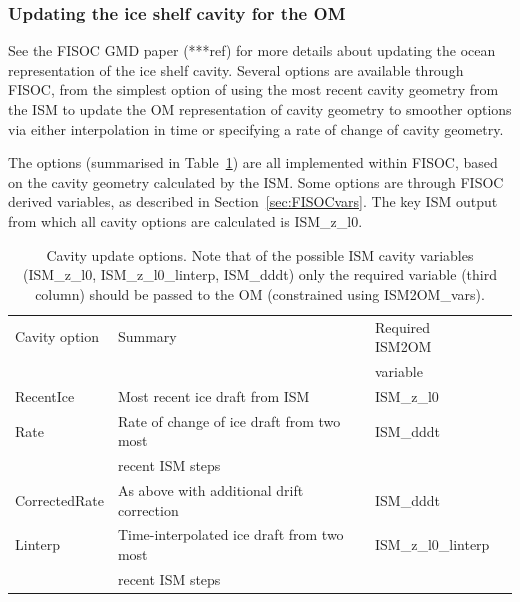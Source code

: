 \documentclass[12pt]{article}
\begin{document}
\subsubsection{Updating the ice shelf cavity for the OM}

See the FISOC GMD paper (***ref) for more details about updating the ocean 
representation of the ice shelf cavity. 
Several options are available through FISOC, from the simplest option of using 
the most recent cavity geometry from the ISM to update the OM representation of 
cavity geometry to smoother options via either interpolation in time or specifying 
a rate of change of cavity geometry.

The options (summarised in Table~\ref{tab:cavity}) are all implemented within FISOC, 
based on the cavity geometry 
calculated by the ISM.  Some options are through FISOC derived variables, as described 
in Section~\ref{sec:FISOCvars}.  The key ISM output from which all cavity options 
are calculated is ISM\_z\_l0.  

\begin{table}
  \begin{center}
    \begin{tabular}{ llll }
      Cavity option  & Summary                                    & Required ISM2OM \\
                     &                                            &  variable       \\
      \hline
      RecentIce      & Most recent ice draft from ISM             & ISM\_z\_l0      \\
      Rate           & Rate of change of ice draft from two most  & ISM\_dddt       \\
                     & recent ISM steps                           &                 \\
      CorrectedRate  & As above with additional drift correction  & ISM\_dddt       \\
      Linterp        & Time-interpolated ice draft from two most  & ISM\_z\_l0\_linterp \\
                     &  recent ISM steps                          &                  \\
    \end{tabular}
  \end{center}
  \caption{
    Cavity update options.  Note that of the possible ISM cavity variables 
    (ISM\_z\_l0, ISM\_z\_l0\_linterp, ISM\_dddt) only the required variable 
    (third column) should be passed to the OM (constrained using ISM2OM\_vars).
  }
  \label{tab:cavity}
\end{table}
\end{document}
